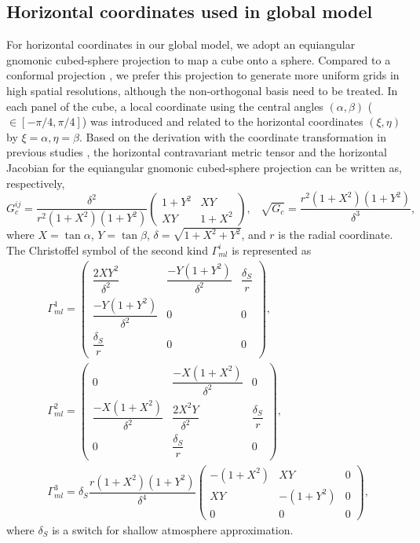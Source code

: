\subsection{Horizontal coordinates used in global model}
For horizontal coordinates in our global model, 
we adopt an equiangular gnomonic cubed-sphere projection \citep{sadourny1972FDMQuasiUniformSphereGrids,RONCHI199693} 
to map a cube onto a sphere.  
Compared to a conformal projection \citep{RANCC1996}, 
we prefer this projection to generate more uniform grids in high spatial resolutions, 
although the non-orthogonal basis need to be treated.
In each panel of the cube, 
a local coordinate using the central angles 
$(\alpha, \beta)$ ($\in [-\pi/4,\pi/4]$) was introduced and 
related to the horizontal coordinates $(\xi, \eta)$ by $\xi=\alpha, \eta=\beta$. 
Based on the derivation with the coordinate transformation 
in previous studies \citep[e.g.,][]{Nair2005DGTransport,ullrich2012dynamical,li2020development}, 
the horizontal contravariant metric tensor and the horizontal Jacobian for the equiangular gnomonic cubed-sphere projection can be written as, respectively,  
\begin{equation}
    G_c^{ij} = \dfrac{\delta^2}{r^2(1+X^2)(1+Y^2)} \begin{pmatrix}
        1+Y^2 & XY \\
        XY    & 1 + X^2
      \end{pmatrix}, \;\;\;
    \sqrt{G_c}=\dfrac{r^2 (1+X^2)(1+Y^2)}{\delta^3}, 
\label{eq:metric_tensor_Jacobian_cubedsphere}
\end{equation}
where $X=\tan \alpha$, $Y=\tan \beta$, $\delta=\sqrt{1+X^2+Y^2}$, and $r$ is the radial coordinate.  
The Christoffel symbol of the second kind  $\Gamma^i_{ml}$ is represented as 
\begin{align}
 &\Gamma^1_{ml} = 
 \begin{pmatrix}
    \dfrac{2XY^2}{\delta^2} & \dfrac{-Y(1+Y^2)}{\delta^2} & \dfrac{\delta_S}{r} \\
    \dfrac{-Y(1+Y^2)}{\delta^2} & 0 & 0  \\ 
    \dfrac{\delta_S}{r} & 0 & 0
  \end{pmatrix}, \nonumber \\
  &\Gamma^2_{ml} = 
  \begin{pmatrix}
     0 & \dfrac{-X(1+X^2)}{\delta^2} & 0 \\
     \dfrac{-X(1+X^2)}{\delta^2} & \dfrac{2X^2 Y}{\delta^2} & \dfrac{\delta_S}{r}  \\ 
     0 & \dfrac{\delta_S}{r} & 0
   \end{pmatrix},  \\
 &\Gamma^3_{ml} = \delta_S \dfrac{r(1+X^2)(1+Y^2)}{\delta^4}
   \begin{pmatrix}
     -(1+X^2) & XY & 0 \\
      XY & -(1+Y^2) & 0  \\ 
      0 & 0 & 0
    \end{pmatrix}, \nonumber
\label{eq:ChristoffelSymbol2ndKind_cubedsphere}
\end{align}
where $\delta_S$ is a switch for shallow atmosphere approximation. 


